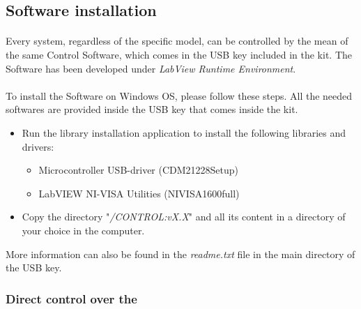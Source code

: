 
\subsection{ \SoftwareType Software installation}   \label{cpt:SW_installation}
\paragraph{} Every \QubeModel  system, regardless of the specific model, can be controlled by the mean of the same Control Software, which comes in the USB key included in the \QubeModel  kit. The \SoftwareType Software has been developed under \textit{LabView Runtime Environment}.

\paragraph{}To install the \SoftwareType Software on Windows OS, please follow these steps. All the needed softwares are provided inside the USB key that comes inside the \QubeModel  kit.
\begin{itemize}
    \item Run the library installation application to install the following libraries and drivers:
    \begin{itemize}
        \item Microcontroller USB-driver (CDM21228\textunderscore Setup)
        \item LabVIEW NI-VISA Utilities (NIVISA1600full)
    \end{itemize}
    \item Copy the directory "\textit{/\QubeModel \textunderscore CONTROL:vX.X}" and all its content in a directory of your choice in the computer.
\end{itemize}
More information can also be found in the \textit{readme.txt} file in the main directory of the USB key.



\iffalse    %
\subsubsection{Direct control over the \QubeModel }  \label{cpt:direct_control}
